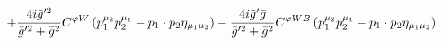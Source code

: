 %
\begin{dmath*}
%
  +  \frac{4 i {\bar g}^{\prime 2}}{{\bar g}^{\prime 2} + {\bar g}{}^2}C^{ \varphi  W} \left(p_1^{\mu_2} p_2^{\mu_1} - p_{1}\nobreak\cdot\nobreak{}p_{2} \eta_{\mu_1 \mu_2}\right)  -  \frac{4 i {\bar g}^\prime {\bar g}{}}{{\bar g}^{\prime 2} + {\bar g}{}^2}C^{ \varphi  WB} \left(p_1^{\mu_2} p_2^{\mu_1} - p_{1}\nobreak\cdot\nobreak{}p_{2} \eta_{\mu_1 \mu_2}\right)
%
\end{dmath*}
%

